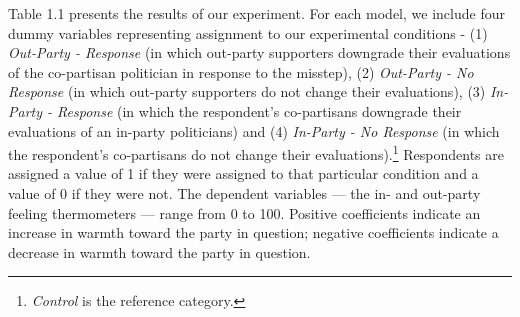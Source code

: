 \documentclass[12pt, letterpaper]{article}
\begin{document}
Table 1.1 presents the results of our experiment. For each model, we include four dummy variables representing assignment to our experimental conditions - (1) \textit{Out-Party - Response} (in which out-party supporters downgrade their evaluations of the co-partisan politician in response to the misstep), (2) \textit{Out-Party - No Response} (in which out-party supporters do not change their evaluations), (3) \textit{In-Party - Response} (in which the respondent's co-partisans downgrade their evaluations of an in-party politicians) and (4) \textit{In-Party - No Response} (in which the respondent's co-partisans do not change their evaluations).\footnote{\textit{Control} is the reference category.} Respondents are assigned a value of 1 if they were assigned to that particular condition and a value of 0 if they were not. The dependent variables --- the in- and out-party feeling thermometers --- range from 0 to 100. Positive coefficients indicate an increase in warmth toward the party in question; negative coefficients indicate a decrease in warmth toward the party in question.
\end{document}
